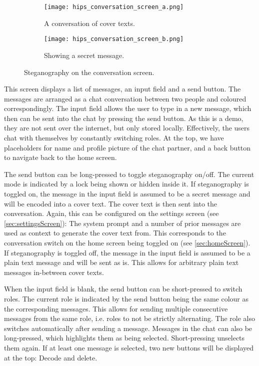 \begin{figure}
	\begin{wide}
		\captionsetup{width=\linewidth}
		\begin{subfigure}{0.45\linewidth}
			\centering
			\texttt{[image: hips\_conversation\_screen\_a.png]}
			\caption{A conversation of cover texts.}
			\label{fig:conversationScreenA}
		\end{subfigure}
        \hfill
		\begin{subfigure}{0.45\linewidth}
			\centering
			\texttt{[image: hips\_conversation\_screen\_b.png]}
			\caption{Showing a secret message.}
			\label{fig:conversationScreenB}
		\end{subfigure}
		\caption[HiPS: Conversation screen]{Steganography on the conversation screen.}
		\label{fig:conversationScreen}
	\end{wide}
\end{figure}

This screen displays a list of messages, an input field and a send button. The messages are arranged as a chat conversation between two people and coloured correspondingly. The input field allows the user to type in a new message, which then can be sent into the chat by pressing the send button. As this is a demo, they are not sent over the internet, but only stored locally. Effectively, the users chat with themselves by constantly switching roles. At the top, we have placeholders for name and profile picture of the chat partner, and a back button to navigate back to the home screen.

The send button can be long-pressed to toggle steganography on/off. The current mode is indicated by a lock being shown or hidden inside it. If steganography is toggled on, the message in the input field is assumed to be a secret message and will be encoded into a cover text. The cover text is then sent into the conversation. Again, this can be configured on the settings screen (see \cref{sec:settingsScreen}): The system prompt and a number of prior messages are used as context to generate the cover text from. This corresponds to the conversation switch on the home screen being toggled on (see \cref{sec:homeScreen}). If steganography is toggled off, the message in the input field is assumed to be a plain text message and will be sent as is. This allows for arbitrary plain text messages in-between cover texts.

When the input field is blank, the send button can be short-pressed to switch roles. The current role is indicated by the send button being the same colour as the corresponding messages. This allows for sending multiple consecutive messages from the same role, i.e. roles to not be strictly alternating. The role also switches automatically after sending a message. Messages in the chat can also be long-pressed, which highlights them as being selected. Short-pressing unselects them again. If at least one message is selected, two new buttons will be displayed at the top: Decode and delete.

